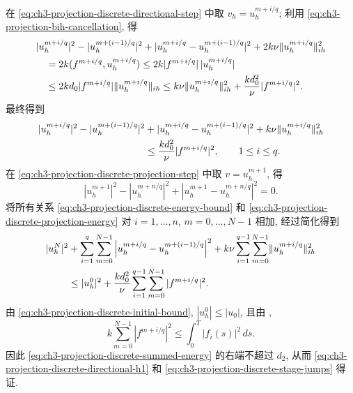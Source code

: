 \begin{Proof}
在 \eqref{eq:ch3-projection-discrete-directional-step} 中取 $v_h=u_h^{m+i/q}$; 利用 \eqref{eq:ch3-projection-bih-cancellation}, 得
\begin{align}
&|u_h^{m+i/q}|^2-|u_h^{m+(i-1)/q}|^2
+|u_h^{m+i/q}-u_h^{m+(i-1)/q}|^2
+2k\nu\lVert u_h^{m+i/q}\rVert_{ih}^2 \notag\\
&\quad=2k(f^{m+i/q},u_h^{m+i/q})
\leq2k|f^{m+i/q}|\,|u_h^{m+i/q}| \notag\\
&\quad\leq2kd_0|f^{m+i/q}|\lVert u_h^{m+i/q}\rVert_{ih}
\leq k\nu\lVert u_h^{m+i/q}\rVert_{ih}^2
+\frac{kd_0^2}{\nu}|f^{m+i/q}|^2.
\label{eq:ch3-projection-discrete-energy}
\end{align}
最终得到
\begin{align}
|u_h^{m+i/q}|^2-|u_h^{m+(i-1)/q}|^2
&+|u_h^{m+i/q}-u_h^{m+(i-1)/q}|^2
+k\nu\lVert u_h^{m+i/q}\rVert_{ih}^2 \notag\\
&\leq\frac{kd_0^2}{\nu}|f^{m+i/q}|^2,
\qquad1\leq i\leq q.
\label{eq:ch3-projection-discrete-energy-bound}
\end{align}
在 \eqref{eq:ch3-projection-discrete-projection-step} 中取 $v=u_h^{m+1}$, 得
\begin{equation}
|u_h^{m+1}|^2-|u_h^{m+n/q}|^2
+|u_h^{m+1}-u_h^{m+n/q}|^2=0.
\label{eq:ch3-projection-discrete-projection-energy}
\end{equation}
将所有关系 \eqref{eq:ch3-projection-discrete-energy-bound} 和 \eqref{eq:ch3-projection-discrete-projection-energy} 对 $i=1,\ldots,n$, $m=0,\ldots,N-1$ 相加, 经过简化得到
\begin{align}
|u_h^N|^2
&+\sum_{i=1}^q\sum_{m=0}^{N-1}
\left|u_h^{m+i/q}-u_h^{m+(i-1)/q}\right|^2
+k\nu\sum_{i=1}^{q-1}\sum_{m=0}^{N-1}
\lVert u_h^{m+i/q}\rVert_{ih}^2 \notag\\
&\leq|u_h^0|^2
+\frac{kd_0^2}{\nu}\sum_{i=1}^{q-1}\sum_{m=0}^{N-1}
|f^{m+i/q}|^2.
\label{eq:ch3-projection-discrete-summed-energy}
\end{align}
由 \eqref{eq:ch3-projection-discrete-initial-bound}, $|u_h^0|\leq|u_0|$, 且由 ,
\[
k\sum_{m=0}^{N-1}|f^{m+i/q}|^2
\leq\int_0^T|f_i(s)|^2\,ds.
\]
因此 \eqref{eq:ch3-projection-discrete-summed-energy} 的右端不超过 $d_2$, 从而 \eqref{eq:ch3-projection-discrete-directional-h1} 和 \eqref{eq:ch3-projection-discrete-stage-jumps} 得证.


\end{Proof}
